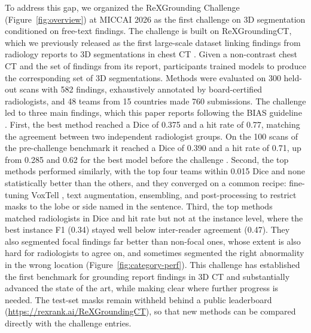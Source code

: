 \documentclass[final,5p,times,twocolumn,authoryear,numafflabel]{elsarticle}
\begin{document}
To address this gap, we organized the ReXGrounding Challenge
(Figure~\ref{fig:overview}) at MICCAI 2026 as the first challenge on 3D
segmentation conditioned on free-text findings. The challenge is built on
ReXGroundingCT, which we previously released as the first large-scale dataset
linking findings from radiology reports to 3D segmentations in chest CT
\citep{baharoon2026rexgroundingct}. Given a non-contrast chest CT and the set of findings from its report,
participants trained models to produce the corresponding set
of 3D segmentations. Methods were evaluated on
300 held-out scans with 582 findings, exhaustively annotated by
board-certified radiologists, and 48 teams from 15 countries made
760 submissions. The challenge led to three main findings, which this paper
reports following the BIAS guideline \citep{maier2020bias}. First, the best method reached a Dice of 0.375 and a hit rate of
0.77, matching the agreement between two independent radiologist groups.
On the 100 scans of the pre-challenge benchmark it reached a Dice of
0.390 and a hit rate of 0.71, up from 0.285 and 0.62 for the best model
before the challenge \citep{rokuss2026voxtell}. Second,
the top methods performed similarly, with the top four teams within 0.015 Dice
and none statistically better than the others, and they converged on a common recipe: fine-tuning VoxTell
\citep[five of the six best teams;][]{rokuss2026voxtell}, text augmentation, ensembling, and post-processing to restrict masks to the lobe
or side named in the sentence.
Third, the top methods matched radiologists in Dice and hit rate but not at
the instance level, where the best instance F1 (0.34) stayed well below
inter-reader agreement (0.47). They also segmented focal findings far better
than non-focal ones, whose extent is also hard for radiologists to agree on,
and sometimes segmented the right abnormality in the wrong location
(Figure~\ref{fig:category-perf}). This challenge has established the first benchmark for grounding
report findings in 3D CT and substantially advanced the state of the art,
while making clear where further progress is needed. The test-set masks remain withheld behind a
public leaderboard (\url{https://rexrank.ai/ReXGroundingCT}), so that
new methods can be compared directly with the challenge entries.
\end{document}
